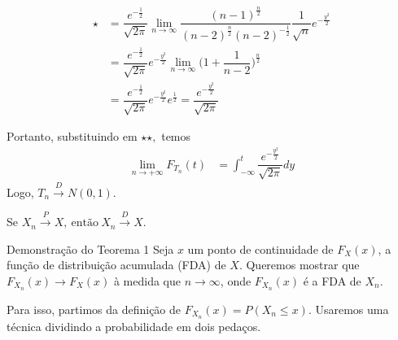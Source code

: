 \documentclass[12pt]{beamer}
\begin{document}
\begin{frame}{}
\begin{block}{}
\justifying
\begin{align*}
    \star&=\dfrac{e^{-\frac{1}{2}}}{\sqrt{2\pi}}{\displaystyle \lim_{n\rightarrow\infty}\dfrac{(n-1)^{\frac{n}{2}}}{(n-2)^{\frac{n}{2}}(n-2)^{-\frac{1}{2}}}}\dfrac{1}{\sqrt{n}}e^{-\frac{y^{2}}{2}}\\
    &=\dfrac{e^{-\frac{1}{2}}}{\sqrt{2\pi}}e^{-\frac{y^{2}}{2}}{\displaystyle \lim_{n\rightarrow\infty}\Big(1+\dfrac{1}{n-2}\Big)^{\frac{n}{2}}}\\
    &=\dfrac{e^{-\frac{1}{2}}}{\sqrt{2\pi}}e^{-\frac{y^{2}}{2}}e^{\frac{1}{2}}=\dfrac{e^{-\frac{y^{2}}{2}}}{\sqrt{2\pi}}
\end{align*}
\end{block}
\pause
\begin{block}{}
\justifying
Portanto, substituindo em $\star\star,$ temos 
\begin{align*}
\lim_{n\rightarrow+\infty}F_{T_{n}}(t)&=\int_{-\infty}^{t}\dfrac{e^{-\frac{y^{2}}{2}}}{\sqrt{2\pi}}dy
\end{align*}
Logo, $T_{n} \overset{D}{\rightarrow} N(0,1).$
\end{block}
\end{frame}

\begin{frame}{}
\begin{Teorema}
\justifying
Se $X_{n} \overset{P}{\rightarrow} X,~\text{então}~X_{n} \overset{D}{\rightarrow} X.$
\end{Teorema}
\pause
\begin{block}{Demonstração do Teorema 1}
	Seja \( x \) um ponto de continuidade de \( F_X(x) \), a função de distribuição acumulada (FDA) de \( X \). Queremos mostrar que \( F_{X_n}(x) \to F_X(x) \) à medida que \( n \to \infty \), onde \( F_{X_n}(x) \) é a FDA de \( X_n \).
	
	Para isso, partimos da definição de \( F_{X_n}(x) = P(X_n \leq x) \). Usaremos uma técnica dividindo a probabilidade em dois pedaços.
\end{block}
\end{frame}
\end{document}
